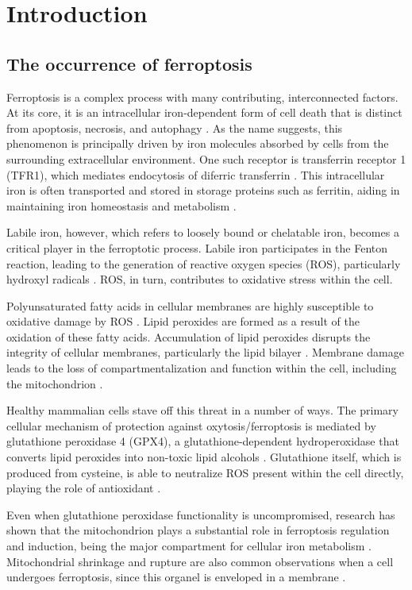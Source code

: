 \chapter[Introduction]%
{Introduction}

\section{The occurrence of ferroptosis}

Ferroptosis is a complex process with many contributing, interconnected factors. At its core, it is an intracellular iron-dependent form of cell death that is distinct from apoptosis, necrosis, and autophagy \parencite{ferro_cd}. As the name suggests, this phenomenon is principally driven by iron molecules absorbed by cells from the surrounding extracellular environment. One such receptor is transferrin receptor 1 (TFR1), which mediates endocytosis of diferric transferrin \citep{tfr1}. This intracellular iron is often transported and stored in storage proteins such as ferritin, aiding in maintaining iron homeostasis and metabolism \citep{ferritin}.

Labile iron, however, which refers to loosely bound or chelatable iron, becomes a critical player in the ferroptotic process. Labile iron participates in the Fenton reaction, leading to the generation of reactive oxygen species (ROS), particularly hydroxyl radicals \citep{labile_iron}. ROS, in turn, contributes to oxidative stress within the cell. 

Polyunsaturated fatty acids in cellular membranes are highly susceptible to oxidative damage by ROS \citep{lpperox}. Lipid peroxides are formed as a result of the oxidation of these fatty acids. Accumulation of lipid peroxides disrupts the integrity of cellular membranes, particularly the lipid bilayer \citep{lppmembrane}. Membrane damage leads to the loss of compartmentalization and function within the cell, including the mitochondrion \citep{lppmito}.

Healthy mammalian cells stave off this threat in a number of ways. The primary cellular mechanism of protection against oxytosis/ferroptosis is mediated by glutathione peroxidase 4 (GPX4), a glutathione-dependent hydroperoxidase that converts lipid peroxides into non-toxic lipid alcohols \citep{gpx4}. Glutathione itself, which is produced from cysteine, is able to neutralize ROS present within the cell directly, playing the role of antioxidant \citep{glutath}. 

Even when glutathione peroxidase functionality is uncompromised, research has shown that the mitochondrion plays a substantial role in ferroptosis regulation and induction, being the major compartment for cellular iron metabolism \citep{mito_ferro2}. Mitochondrial shrinkage and rupture are also common observations when a cell undergoes ferroptosis, since this organel is enveloped in a membrane \citep{mito_ferro}.

